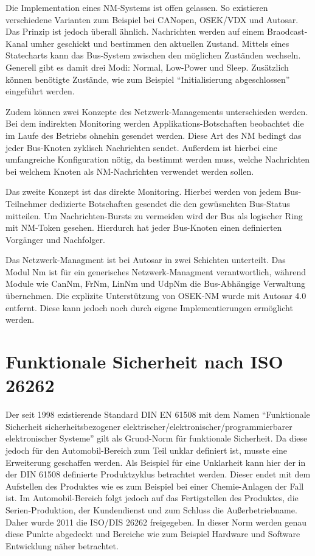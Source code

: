 \documentclass[
  a4paper,					    %
  twoside,
  DIV=calc,     				%
  bibliography=totoc,
  cleardoublepage=empty,
  ngerman,     					%
  final       					%
]{scrbook}
\begin{document}
Die Implementation eines NM-Systems ist offen gelassen. So existieren verschiedene Varianten zum Beispiel bei CANopen, OSEK/VDX und Autosar. Das Prinzip ist jedoch überall ähnlich. Nachrichten werden auf einem Braodcast-Kanal umher geschickt und bestimmen den aktuellen Zustand. Mittels eines Statecharts kann das Bus-System zwischen den möglichen Zuständen wechseln. Generell gibt es damit drei Modi: Normal, Low-Power und Sleep. Zusätzlich können benötigte Zustände, wie zum Beispiel "`Initialisierung abgeschlossen"' eingeführt werden.

Zudem können zwei Konzepte des Netzwerk-Managements unterschieden werden. Bei dem indirekten Monitoring werden Applikations-Botschaften beobachtet die im Laufe des Betriebs ohnehin gesendet werden. Diese Art des NM bedingt das jeder Bus-Knoten zyklisch Nachrichten sendet. Außerdem ist hierbei eine umfangreiche Konfiguration nötig, da bestimmt werden muss, welche Nachrichten bei welchem Knoten als NM-Nachrichten verwendet werden sollen.

Das zweite Konzept ist das direkte Monitoring. Hierbei werden von jedem Bus-Teilnehmer dedizierte Botschaften gesendet die den gewüsnchten Bus-Status mitteilen. Um Nachrichten-Bursts zu vermeiden wird der Bus als logischer Ring mit NM-Token gesehen. Hierdurch hat jeder Bus-Knoten einen definierten Vorgänger und Nachfolger.

Das Netzwerk-Managment ist bei Autosar in zwei Schichten unterteilt. Das Modul Nm ist für ein generisches Netzwerk-Managment verantwortlich, während Module wie CanNm, FrNm, LinNm und UdpNm die Bus-Abhängige Verwaltung übernehmen. Die explizite Unterstützung von OSEK-NM wurde mit Autosar 4.0 entfernt. Diese kann jedoch noch durch eigene Implementierungen ermöglicht werden.



\section{Funktionale Sicherheit nach ISO 26262}
\label{sec:Sicherheit}
Der seit 1998 existierende Standard DIN EN 61508 mit dem Namen "`Funktionale Sicherheit sicherheitsbezogener elektrischer/elektronischer/programmierbarer elektronischer Systeme"' gilt als Grund-Norm für funktionale Sicherheit. Da diese jedoch für den Automobil-Bereich zum Teil unklar definiert ist, musste eine Erweiterung geschaffen werden. Als Beispiel für eine Unklarheit kann hier der in der DIN 61508 definierte Produktzyklus betrachtet werden. Dieser endet mit dem Aufstellen des Produktes wie es zum Beispiel bei einer Chemie-Anlagen der Fall ist. Im Automobil-Bereich folgt jedoch auf das Fertigstellen des Produktes, die Serien-Produktion, der Kundendienst und zum Schluss die Außerbetriebname. Daher wurde 2011 die ISO/DIS 26262 freigegeben. In dieser Norm werden genau diese Punkte abgedeckt und Bereiche wie zum Beispiel Hardware und Software Entwicklung näher betrachtet.
\end{document}
